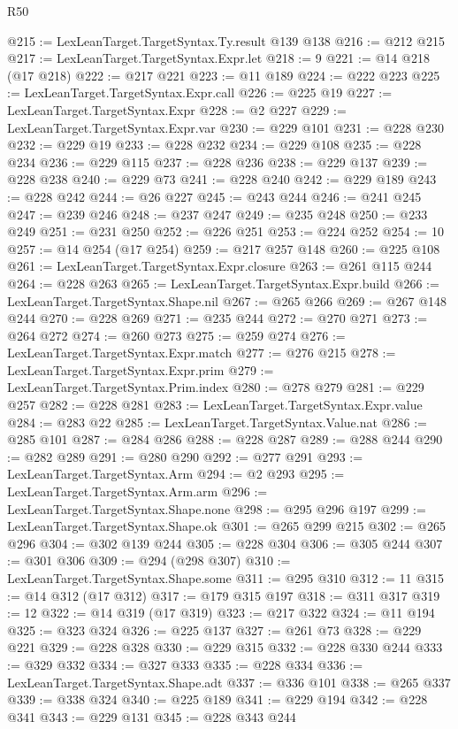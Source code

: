 \begin{lexlean}{R50}
\begin{coremodule}
@215 := LexLeanTarget.TargetSyntax.Ty.result @139 @138
@216 := @212 @215
@217 := LexLeanTarget.TargetSyntax.Expr.let
@218 := 9
@221 := @14 @218 (@17 @218)
@222 := @217 @221
@223 := @11 @189
@224 := @222 @223
@225 := LexLeanTarget.TargetSyntax.Expr.call
@226 := @225 @19
@227 := LexLeanTarget.TargetSyntax.Expr
@228 := @2 @227
@229 := LexLeanTarget.TargetSyntax.Expr.var
@230 := @229 @101
@231 := @228 @230
@232 := @229 @19
@233 := @228 @232
@234 := @229 @108
@235 := @228 @234
@236 := @229 @115
@237 := @228 @236
@238 := @229 @137
@239 := @228 @238
@240 := @229 @73
@241 := @228 @240
@242 := @229 @189
@243 := @228 @242
@244 := @26 @227
@245 := @243 @244
@246 := @241 @245
@247 := @239 @246
@248 := @237 @247
@249 := @235 @248
@250 := @233 @249
@251 := @231 @250
@252 := @226 @251
@253 := @224 @252
@254 := 10
@257 := @14 @254 (@17 @254)
@259 := @217 @257 @148
@260 := @225 @108
@261 := LexLeanTarget.TargetSyntax.Expr.closure
@263 := @261 @115 @244
@264 := @228 @263
@265 := LexLeanTarget.TargetSyntax.Expr.build
@266 := LexLeanTarget.TargetSyntax.Shape.nil
@267 := @265 @266
@269 := @267 @148 @244
@270 := @228 @269
@271 := @235 @244
@272 := @270 @271
@273 := @264 @272
@274 := @260 @273
@275 := @259 @274
@276 := LexLeanTarget.TargetSyntax.Expr.match
@277 := @276 @215
@278 := LexLeanTarget.TargetSyntax.Expr.prim
@279 := LexLeanTarget.TargetSyntax.Prim.index
@280 := @278 @279
@281 := @229 @257
@282 := @228 @281
@283 := LexLeanTarget.TargetSyntax.Expr.value
@284 := @283 @22
@285 := LexLeanTarget.TargetSyntax.Value.nat
@286 := @285 @101
@287 := @284 @286
@288 := @228 @287
@289 := @288 @244
@290 := @282 @289
@291 := @280 @290
@292 := @277 @291
@293 := LexLeanTarget.TargetSyntax.Arm
@294 := @2 @293
@295 := LexLeanTarget.TargetSyntax.Arm.arm
@296 := LexLeanTarget.TargetSyntax.Shape.none
@298 := @295 @296 @197
@299 := LexLeanTarget.TargetSyntax.Shape.ok
@301 := @265 @299 @215
@302 := @265 @296
@304 := @302 @139 @244
@305 := @228 @304
@306 := @305 @244
@307 := @301 @306
@309 := @294 (@298 @307)
@310 := LexLeanTarget.TargetSyntax.Shape.some
@311 := @295 @310
@312 := 11
@315 := @14 @312 (@17 @312)
@317 := @179 @315 @197
@318 := @311 @317
@319 := 12
@322 := @14 @319 (@17 @319)
@323 := @217 @322
@324 := @11 @194
@325 := @323 @324
@326 := @225 @137
@327 := @261 @73
@328 := @229 @221
@329 := @228 @328
@330 := @229 @315
@332 := @228 @330 @244
@333 := @329 @332
@334 := @327 @333
@335 := @228 @334
@336 := LexLeanTarget.TargetSyntax.Shape.adt
@337 := @336 @101
@338 := @265 @337
@339 := @338 @324
@340 := @225 @189
@341 := @229 @194
@342 := @228 @341
@343 := @229 @131
@345 := @228 @343 @244

\end{coremodule}
\end{lexlean}
